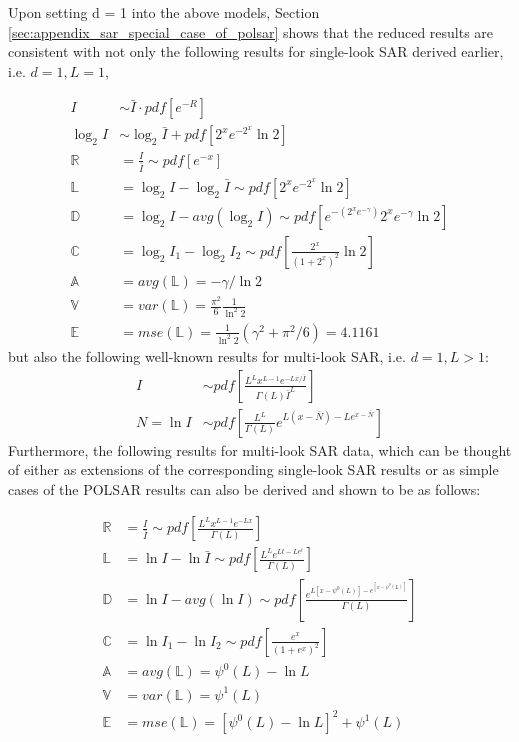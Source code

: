 Upon setting d = 1 into the above models,
  Section \ref{sec:appendix_sar_special_case_of_polsar} shows that the reduced results
are consistent with not only the following results for single-look SAR derived earlier, i.e. $d =1,  L = 1$,

{\footnotesize
\begin{align}  
  I &\sim \bar{I} \cdot pdf \left[ e^{-R} \right] \\
  \log_2{I} &\sim \log_2{\bar{I}} + pdf \left[ 2^xe^{-2^x}\ln2 \right] \\
  \mathbb{R} &= \frac{I}{\bar{I}} \sim pdf \left[ e^{-x} \right]  \\
  \mathbb{L} &= \log_2{I} - \log_2{\bar{I}} \sim pdf \left[ 2^xe^{-2^x}\ln2 \right]\\
  \mathbb{D} &= \log_2{I} - avg(\log_2{I}) \sim pdf \left[ e^{-(2^xe^{-\gamma})} 2^xe^{-\gamma} \ln2 \right] \\
  \mathbb{C} &= \log_2{I_1} - \log_2{I_2} \sim pdf \left[ \frac{2^x}{(1+2^x)^2} \ln2 \right] \\
  \mathbb{A} &= avg(\mathbb{L}) = -\gamma / \ln{2} \\
  \mathbb{V} &= var(\mathbb{L}) = \frac{\pi^2}{6} \frac{1}{ \ln^2{2}} \\
  \mathbb{E} &= mse(\mathbb{L}) = \frac{1}{\ln^2{2}}( \gamma^2 + \pi^2/6 ) = 4.1161 
\end{align}
}%
but also the following well-known results for multi-look SAR, i.e. $d=1,L>1$:
  \begin{align}
I &\sim pdf \left[ \frac{L^L x^{L-1} e^{-Lx/\bar{I}}}{\Gamma(L) \bar{I}^L} \right] \\
N = \ln{I} &\sim pdf \left[ \frac{L^L}{\Gamma(L)} e^{L(x-\bar{N})-Le^{x-\bar{N}}} \right]
  \end{align}
Furthermore, the following results for multi-look SAR data, which can be thought of
either as extensions of the corresponding single-look SAR results or as simple cases of
the POLSAR results can also be derived and shown to be as follows:

  \begin{align}
    \mathbb{R} &= \frac{I}{\bar{I}} \sim pdf \left[ \frac{ L^{L} x^{L-1} e^{-Lx}}{ \Gamma(L)} \label{eqn:multi_look_SAR_ratio_dist} \right]\\
    \mathbb{L} &= \ln{I} - \ln{\bar{I}} \sim pdf \left[ \frac{L^Le^{Lt-Le^t}}{ \Gamma(L)}  \right] \\
    \mathbb{D} &= \ln{I} - avg(\ln{I}) \sim pdf \left[ \frac{e^{L[x-\psi^0(L)]-e^{[x-\psi^0(L)]}}}{\Gamma(L)} \right] \\
    \mathbb{C} &= \ln{I_1} - \ln{I_2} \sim pdf \left[ \frac{e^{x}}{(1+e^x)^{2}} \right] \\
    \mathbb{A} &= avg(\mathbb{L}) = \psi^0(L) - \ln{L} \\
    \mathbb{V} &= var(\mathbb{L}) = \psi^1(L) \\
    \mathbb{E} &= mse(\mathbb{L}) = \left[ \psi^0(L) - \ln{L} \right]^2 + \psi^1(L)
  \end{align}

